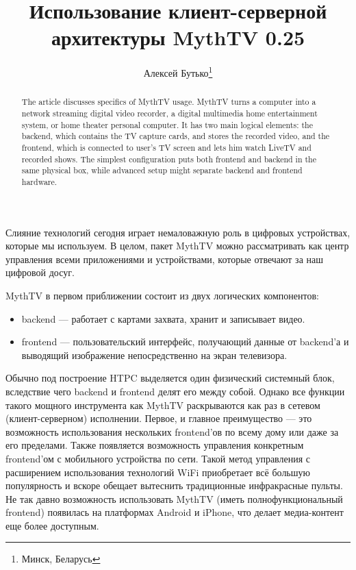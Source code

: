 \documentclass[10pt, a5paper]{article}
\begin{document}
\title{Использование клиент-серверной архитектуры MythTV 0.25}%

\author{Алексей Бутько\footnote{Минск, Беларусь}}
\maketitle

\begin{abstract}
The article discusses specifics of MythTV usage. MythTV turns a computer into a network streaming digital video recorder, a digital multimedia home entertainment system, or home theater personal computer. It has two main logical elements: the backend, which contains the TV capture cards, and stores the recorded video, and the frontend, which is connected to user's TV screen and lets him watch LiveTV and recorded shows. The simplest configuration puts both frontend and backend in the same physical box, while advanced setup might separate backend and frontend hardware.
\end{abstract}


Слияние технологий сегодня играет немаловажную роль в цифровых устройствах, которые мы используем. В целом, пакет MythTV можно рассматривать как центр управления всеми приложениями и устройствами, которые отвечают за наш цифровой досуг.

MythTV в первом приближении состоит из двух логических компонентов:

\begin{itemize}
  \item backend --- работает с картами захвата, хранит и записывает видео.
  \item frontend --- пользовательский интерфейс, получающий данные от backend'а и выводящий изображение непосредственно на экран телевизора.
\end{itemize}

Обычно под построение HTPC выделяется один физический системный блок, вследствие чего backend и frontend делят его между собой.  Однако все функции такого мощного инструмента как MythTV раскрываются как раз в сетевом (клиент-серверном) исполнении. Первое, и главное преимущество --- это возможность использования нескольких frontend'ов по всему дому или даже за его пределами. Также появляется возможность управления конкретным frontend'ом с мобильного устройства по сети. Такой метод управления с расширением использования технологий WiFi приобретает всё большую популярность и вскоре обещает вытеснить традиционные инфракрасные пульты. Не так давно возможность использовать MythTV (иметь полнофункциональный frontend)  появилась на платформах Android и iPhone, что делает медиа-контент еще более доступным.
\end{document}
